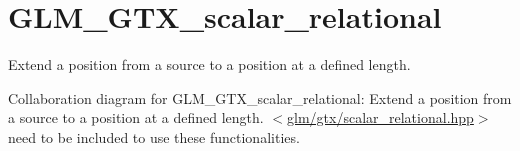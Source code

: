 \hypertarget{group__gtx__scalar__relational}{\section{G\-L\-M\-\_\-\-G\-T\-X\-\_\-scalar\-\_\-relational}
\label{group__gtx__scalar__relational}
}


Extend a position from a source to a position at a defined length.  


Collaboration diagram for G\-L\-M\-\_\-\-G\-T\-X\-\_\-scalar\-\_\-relational\-:
Extend a position from a source to a position at a defined length. $<$\hyperlink{scalar__relational_8hpp}{glm/gtx/scalar\-\_\-relational.\-hpp}$>$ need to be included to use these functionalities. 
